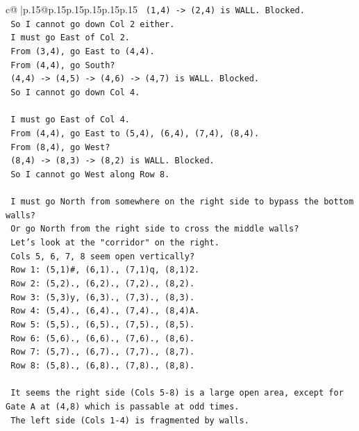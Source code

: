 \documentclass{article}
\begin{document}
{\begin{supertabular}{c@{$\;$}|p{.15\linewidth}@{}p{.15\linewidth}p{.15\linewidth}p{.15\linewidth}p{.15\linewidth}p{.15\linewidth}}
{{{\texttt{   (1,4) {-}> (2,4) is WALL. Blocked.} \\
\texttt{   So I cannot go down Col 2 either.} \\
\texttt{   I must go East of Col 2.} \\
\texttt{   From (3,4), go East to (4,4).} \\
\texttt{   From (4,4), go South?} \\
\texttt{   (4,4) {-}> (4,5) {-}> (4,6) {-}> (4,7) is WALL. Blocked.} \\
\texttt{   So I cannot go down Col 4.} \\
\\ 
\texttt{   I must go East of Col 4.} \\
\texttt{   From (4,4), go East to (5,4), (6,4), (7,4), (8,4).} \\
\texttt{   From (8,4), go West?} \\
\texttt{   (8,4) {-}> (8,3) {-}> (8,2) is WALL. Blocked.} \\
\texttt{   So I cannot go West along Row 8.} \\
\\ 
\texttt{   I must go North from somewhere on the right side to bypass the bottom walls?} \\
\texttt{   Or go North from the right side to cross the middle walls?} \\
\texttt{   Let's look at the "corridor" on the right.} \\
\texttt{   Cols 5, 6, 7, 8 seem open vertically?} \\
\texttt{   Row 1: (5,1)\#, (6,1)., (7,1)q, (8,1)2.} \\
\texttt{   Row 2: (5,2)., (6,2)., (7,2)., (8,2).} \\
\texttt{   Row 3: (5,3)y, (6,3)., (7,3)., (8,3).} \\
\texttt{   Row 4: (5,4)., (6,4)., (7,4)., (8,4)A.} \\
\texttt{   Row 5: (5,5)., (6,5)., (7,5)., (8,5).} \\
\texttt{   Row 6: (5,6)., (6,6)., (7,6)., (8,6).} \\
\texttt{   Row 7: (5,7)., (6,7)., (7,7)., (8,7).} \\
\texttt{   Row 8: (5,8)., (6,8)., (7,8)., (8,8).} \\
\\ 
\texttt{   It seems the right side (Cols 5{-}8) is a large open area, except for Gate A at (4,8) which is passable at odd times.} \\
\texttt{   The left side (Cols 1{-}4) is fragmented by walls.} \\
}}}
\end{supertabular}}
\end{document}
